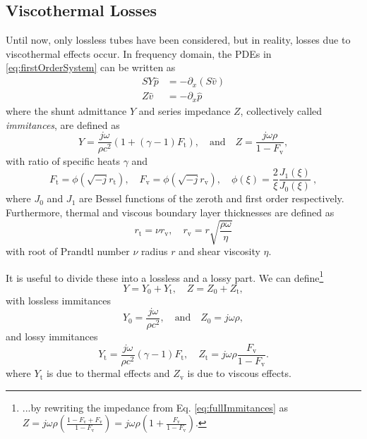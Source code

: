 \documentclass[dvipsnames]{article}
\begin{document}
\subsection{Viscothermal Losses}
Until now, only lossless tubes have been considered, but in reality, losses due to viscothermal effects occur. In frequency domain, the PDEs in \eqref{eq:firstOrderSystem} can be written as  
\begin{subequations}\label{eq:firstOrderSystemFreq}
    \begin{align}
        SY\hat p &= -\partial_x(S\hat v)\\
        Z\hat v &= -\partial_x \hat p
    \end{align}    
\end{subequations}
where the shunt admittance $Y$ and series impedance $Z$, collectively called \textit{immitances}, are defined as
\begin{equation}\label{eq:fullImmitances}
    Y = \frac{j\omega}{\rho c^2}(1+(\gamma-1)F_\text{t}),\quad \text{and} \quad Z = \frac{ j\omega\rho }{1-F_\text{v}},
\end{equation}
with ratio of specific heats $\gamma$ and
\begin{equation}
    F_\text{t} = \phi \left(\sqrt{-j}r_\text{t}\right), \quad F_\text{v} = \phi\left(\sqrt{-j}r_\text{v}\right), \quad \phi(\xi) = \frac{2}{\xi}\frac{J_1(\xi)}{J_0(\xi)}\ ,
\end{equation}
where $J_0$ and $J_1$ are Bessel functions of the zeroth and first order respectively.
Furthermore, thermal and viscous boundary layer thicknesses are defined as
\begin{equation}
    r_\text{t} = \nu r_\text{v}, \quad r_\text{v} = r\sqrt{\frac{\rho \omega}{\eta}}
\end{equation}
with root of Prandtl number $\nu$ radius $r$ and shear viscosity $\eta$.

It is useful to divide these into a lossless and a lossy part. We can define\footnote{...by rewriting the impedance from Eq. \eqref{eq:fullImmitances} as $
     Z = j\omega\rho \left(\frac{1 - F_\text{v} + F_\text{v}}{1-F_\text{v}}\right) = j \omega\rho  \left(1 + \frac{F_\text{v}}{1-F_\text{v}}\right)
$.}
\begin{equation}\label{eq:lossyLosslessImmitances}
    Y = Y_0 + Y_\text{t}, \quad Z = Z_0 + Z_\text{t},
\end{equation}
with lossless immitances
\begin{equation}
   Y_0 = \frac{j\omega}{\rho c^2}, \quad \text{and} \quad Z_0 = j\omega\rho,
\end{equation}
and lossy immitances
\begin{equation}
Y_\text{t} = \frac{j\omega}{\rho c^2} (\gamma - 1)F_\text{t},\quad Z_\text{t} = j \omega\rho  \frac{F_\text{v}}{1-F_\text{v}}.
\end{equation}
where $Y_\text{t}$ is due to thermal effects and $Z_\text{v}$ is due to viscous effects. 
\end{document}
